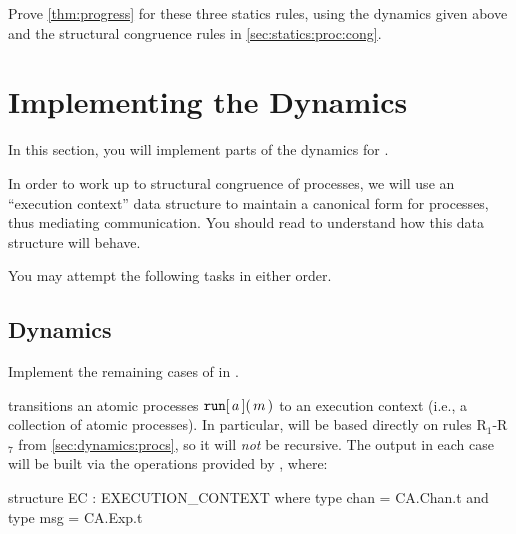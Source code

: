 \documentclass[11pt]{article}
\begin{document}
\begin{task}{15}
  Prove \cref{thm:progress} for these three statics rules, using the dynamics given above and the structural congruence rules in \cref{sec:statics:proc:cong}.
\end{task}


\section{Implementing the Dynamics}\label{sec:dyn-impl}

In this section, you will implement parts of the dynamics for \LangCA.

In order to work up to structural congruence of processes, we will use an ``execution context'' data structure to maintain a canonical form for processes, thus mediating communication.
You should read  to understand how this data structure will behave.

\begin{remark}
  You may attempt the following tasks in either order.
\end{remark}

\subsection{Dynamics}

Implement the remaining cases of  in .

 transitions an atomic processes ${{\mathtt{run}}\mathtt{[}\,{a}\,\mathtt{]}}\mathtt{(}\,m\,\mathtt{)}$ to an execution context (i.e., a collection of atomic processes).
In particular,  will be based directly on rules R$_1$-R$_7$ from \cref{sec:dynamics:procs}, so it will \emph{not} be recursive.
The output in each case will be built via the operations provided by , where:
\begin{codeblock}
  structure EC : EXECUTION_CONTEXT where type chan = CA.Chan.t
  and type msg  = CA.Exp.t
\end{codeblock}
\end{document}
